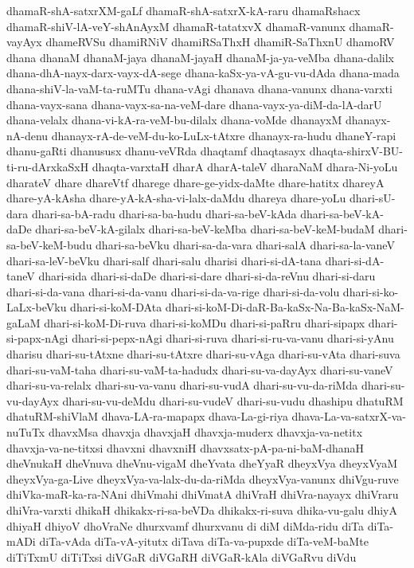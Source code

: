 {dhamaR-shA-satxrXM-gaLf
dhamaR-shA-satxrX-kA-raru
dhamaRshacx
dhamaR-shiV-lA-veY-shAnAyxM
dhamaR-tatatxvX
dhamaR-vanunx
dhamaR-vayAyx
dhameRVSu
dhamiRNiV
dhamiRSaThxH
dhamiR-SaThxnU
dhamoRV
dhana
dhanaM
dhanaM-jaya
dhanaM-jayaH
dhanaM-ja-ya-veMba
dhana-dalilx
dhana-dhA-nayx-darx-vayx-dA-sege
dhana-kaSx-ya-vA-gu-vu-dAda
dhana-mada
dhana-shiV-la-vaM-ta-ruMTu
dhana-vAgi
dhanava
dhana-vanunx
dhana-varxti
dhana-vayx-sana
dhana-vayx-sa-na-veM-dare
dhana-vayx-ya-diM-da-lA-darU
dhana-velalx
dhana-vi-kA-ra-veM-bu-dilalx
dhana-voMde
dhanayxM
dhanayx-nA-denu
dhanayx-rA-de-veM-du-ko-LuLx-tAtxre
dhanayx-ra-hudu
dhaneY-rapi
dhanu-gaRti
dhanususx
dhanu-veVRda
dhaqtamf
dhaqtasayx
dhaqta-shirxV-BU-ti-ru-dArxkaSxH
dhaqta-varxtaH
dharA
dharA-taleV
dharaNaM
dhara-Ni-yoLu
dharateV
dhare
dhareVtf
dharege
dhare-ge-yidx-daMte
dhare-hatitx
dhareyA
dhare-yA-kAsha
dhare-yA-kA-sha-vi-lalx-daMdu
dhareya
dhare-yoLu
dhari-sU-dara
dhari-sa-bA-radu
dhari-sa-ba-hudu
dhari-sa-beV-kAda
dhari-sa-beV-kA-daDe
dhari-sa-beV-kA-gilalx
dhari-sa-beV-keMba
dhari-sa-beV-keM-budaM
dhari-sa-beV-keM-budu
dhari-sa-beVku
dhari-sa-da-vara
dhari-salA
dhari-sa-la-vaneV
dhari-sa-leV-beVku
dhari-salf
dhari-salu
dharisi
dhari-si-dA-tana
dhari-si-dA-taneV
dhari-sida
dhari-si-daDe
dhari-si-dare
dhari-si-da-reVnu
dhari-si-daru
dhari-si-da-vana
dhari-si-da-vanu
dhari-si-da-va-rige
dhari-si-da-volu
dhari-si-ko-LaLx-beVku
dhari-si-koM-DAta
dhari-si-koM-Di-daR-Ba-kaSx-Na-Ba-kaSx-NaM-gaLaM
dhari-si-koM-Di-ruva
dhari-si-koMDu
dhari-si-paRru
dhari-sipapx
dhari-si-papx-nAgi
dhari-si-pepx-nAgi
dhari-si-ruva
dhari-si-ru-va-vanu
dhari-si-yAnu
dharisu
dhari-su-tAtxne
dhari-su-tAtxre
dhari-su-vAga
dhari-su-vAta
dhari-suva
dhari-su-vaM-taha
dhari-su-vaM-ta-hadudx
dhari-su-va-dayAyx
dhari-su-vaneV
dhari-su-va-relalx
dhari-su-va-vanu
dhari-su-vudA
dhari-su-vu-da-riMda
dhari-su-vu-dayAyx
dhari-su-vu-deMdu
dhari-su-vudeV
dhari-su-vudu
dhashipu
dhatuRM
dhatuRM-shiVlaM
dhava-LA-ra-mapapx
dhava-La-gi-riya
dhava-La-va-satxrX-va-nuTuTx
dhavxMsa
dhavxja
dhavxjaH
dhavxja-muderx
dhavxja-va-netitx
dhavxja-va-ne-titxsi
dhavxni
dhavxniH
dhavxsatx-pA-pa-ni-baM-dhanaH
dheVnukaH
dheVnuva
dheVnu-vigaM
dheYvata
dheYyaR
dheyxVya
dheyxVyaM
dheyxVya-ga-Live
dheyxVya-va-lalx-du-da-riMda
dheyxVya-vanunx
dhiVgu-ruve
dhiVka-maR-ka-ra-NAni
dhiVmahi
dhiVmatA
dhiVraH
dhiVra-nayayx
dhiVraru
dhiVra-varxti
dhikaH
dhikakx-ri-sa-beVDa
dhikakx-ri-suva
dhika-vu-galu
dhiyA
dhiyaH
dhiyoV
dhoVraNe
dhurxvamf
dhurxvanu
di
diM
diMda-ridu
diTa
diTa-mADi
diTa-vAda
diTa-vA-yitutx
diTava
diTa-va-pupxde
diTa-veM-baMte
diTiTxmU
diTiTxsi
diVGaR
diVGaRH
diVGaR-kAla
diVGaRvu
diVdu
}
